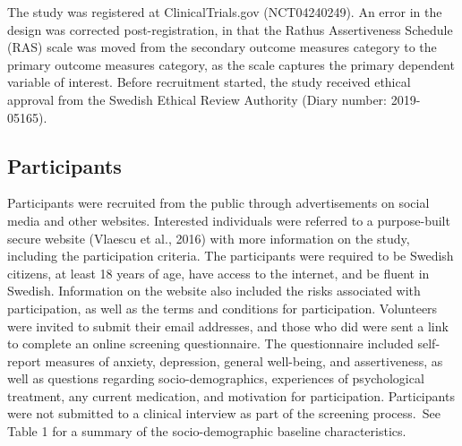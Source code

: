 \documentclass[3p]{elsarticle} %
\begin{document}
The study was registered at ClinicalTrials.gov (NCT04240249). An error
in the design was corrected post-registration, in that the Rathus
Assertiveness Schedule (RAS) scale was moved from the secondary outcome
measures category to the primary outcome measures category, as the scale
captures the primary dependent variable of interest. Before recruitment
started, the study received ethical approval from the Swedish Ethical
Review Authority (Diary number: 2019-05165).

\hypertarget{participants}{%
\subsection{Participants}\label{participants}}

Participants were recruited from the public through advertisements on
social media and other websites. Interested individuals were referred to
a purpose-built secure website (Vlaescu et al., 2016) with more
information on the study, including the participation criteria. The
participants were required to be Swedish citizens, at least 18 years of
age, have access to the internet, and be fluent in Swedish. Information
on the website also included the risks associated with participation, as
well as the terms and conditions for participation. Volunteers were
invited to submit their email addresses, and those who did were sent a
link to complete an online screening questionnaire. The questionnaire
included self-report measures of anxiety, depression, general
well-being, and assertiveness, as well as questions regarding
socio-demographics, experiences of psychological treatment, any current
medication, and motivation for participation.
\color{newtext}Participants were not submitted to a clinical interview
as part of the screening process.\color{oldtext}~See Table 1 for a
summary of the socio-demographic baseline characteristics.
\end{document}

